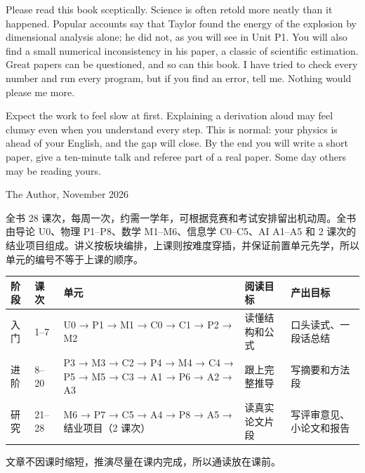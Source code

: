 \documentclass[11pt,a4paper]{article}
\begin{document}
\pn Please read this book sceptically. Science is often retold more neatly than it happened. Popular accounts say that Taylor found the energy of the explosion by dimensional analysis alone; he did not, as you will see in Unit P1. You will also find a small numerical inconsistency in his paper, a classic of scientific estimation. Great papers can be questioned, and so can this book. I have tried to check every number and run every program, but if you find an error, tell me. Nothing would please me more.

\enlargethispage{\baselineskip}
\pn Expect the work to feel slow at first. Explaining a derivation aloud may feel clumsy even when you understand every step. This is normal: your physics is ahead of your English, and the gap will close. By the end you will write a short paper, give a ten-minute talk and referee part of a real paper. Some day others may be reading yours.

\vspace{2pt}
{\raggedleft The Author, November 2026\par}

\clearpage
\normallayout


全书 28 课次，每周一次，约需一学年，可根据竞赛和考试安排留出机动周。全书由导论 U0、物理 P1–P8、数学 M1–M6、信息学 C0–C5、AI A1–A5 和 2 课次的结业项目组成。讲义按板块编排，上课则按难度穿插，并保证前置单元先学，所以单元的编号不等于上课的顺序。

\begin{center}
\small
\begin{tabular}{p{1.2cm}p{1.2cm}p{7.4cm}p{2.2cm}p{2.2cm}}
\toprule
\headrow 阶段 & 课次 & 单元 & 阅读目标 & 产出目标 \\
\midrule
入门 & 1–7 & U0 → P1 → M1 → C0 → C1 → P2 → M2 & 读懂结构和公式 & 口头读式、一段话总结 \\
\midrule
进阶 & 8–20 & P3 → M3 → C2 → P4 → M4 → C4 → P5 → M5 → C3 → A1 → P6 → A2 → A3 & 跟上完整推导 & 写摘要和方法段 \\
\midrule
研究 & 21–28 & M6 → P7 → C5 → A4 → P8 → A5 → 结业项目（2 课次） & 读真实论文片段 & 写评审意见、小论文和报告 \\
\bottomrule
\end{tabular}
\end{center}

文章不因课时缩短，推演尽量在课内完成，所以通读放在课前。
\end{document}
